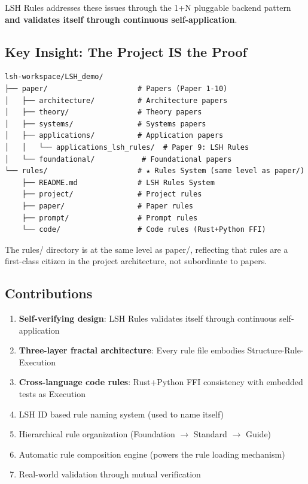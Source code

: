 \documentclass{article}
\begin{document}
LSH Rules addresses these issues through the 1+N pluggable backend pattern \textbf{and validates itself through continuous self-application}.

\subsection{Key Insight: The Project IS the Proof}

\begin{lstlisting}
lsh-workspace/LSH_demo/
├── paper/                     # Papers (Paper 1-10)
│   ├── architecture/          # Architecture papers
│   ├── theory/                # Theory papers
│   ├── systems/               # Systems papers
│   ├── applications/          # Application papers
│   │   └── applications_lsh_rules/  # Paper 9: LSH Rules
│   └── foundational/           # Foundational papers
└── rules/                     # ★ Rules System (same level as paper/)
    ├── README.md              # LSH Rules System
    ├── project/               # Project rules
    ├── paper/                 # Paper rules
    ├── prompt/                # Prompt rules
    └── code/                  # Code rules (Rust+Python FFI)
\end{lstlisting}

The rules/ directory is at the same level as paper/, reflecting that rules are a first-class citizen in the project architecture, not subordinate to papers.

\subsection{Contributions}

\begin{enumerate}
    \item \textbf{Self-verifying design}: LSH Rules validates itself through continuous self-application
    \item \textbf{Three-layer fractal architecture}: Every rule file embodies Structure$\cdot$Rule$\cdot$Execution
    \item \textbf{Cross-language code rules}: Rust+Python FFI consistency with embedded tests as Execution
    \item LSH ID based rule naming system (used to name itself)
    \item Hierarchical rule organization (Foundation $\rightarrow$ Standard $\rightarrow$ Guide)
    \item Automatic rule composition engine (powers the rule loading mechanism)
    \item Real-world validation through mutual verification
\end{enumerate}
\end{document}
